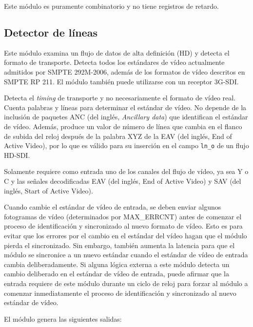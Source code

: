 Este módulo es puramente combinatorio y no tiene registros de retardo.


\subsection{Detector de líneas}

Este módulo examina un flujo de datos de alta definición (HD) y detecta el
formato de transporte. Detecta todos los estándares de vídeo actualmente
admitidos por SMPTE 292M-2006, además de los formatos de vídeo descritos en
SMPTE RP 211. El módulo también puede utilizarse con un receptor 3G-SDI\@.

Detecta el \textit{timing} de transporte y no necesariamente el formato de vídeo real.
Cuenta palabras y líneas para determinar el estándar de vídeo. No depende de la
inclusión de paquetes ANC (del inglés, \textit{Ancillary data}) que identifican el estándar de vídeo. Además, produce
un valor de número de línea que cambia en el flanco de subida del reloj después
de la palabra XYZ de la EAV (del inglés, End of Active Video), por lo que es válido para su inserción en el campo
\texttt{ln\_o} de un flujo HD-SDI\@.

Solamente requiere como entrada uno de los canales del flujo de vídeo, ya sea Y
o C y las señales decodificadas EAV  (del inglés, End of Active Video) y SAV (del inglés, Start of Active Video)\@.

Cuando cambie el estándar de vídeo de entrada, se deben enviar algunos fotogramas
de vídeo (determinados por MAX\_ERRCNT) antes de comenzar el proceso de
identificación y sincronizado al nuevo formato de vídeo. Esto es para evitar que los
errores por el cambio en el estándar del vídeo hagan que el módulo pierda el
sincronizado. Sin embargo, también aumenta la latencia para que el módulo se sincronice a
un nuevo estándar cuando el estándar de vídeo de entrada cambia deliberadamente.
Si alguna lógica externa a este módulo detecta un cambio deliberado
en el estándar de vídeo de entrada, puede afirmar que la entrada requiere de este
módulo durante un ciclo de reloj para forzar al módulo a comenzar inmediatamente
el proceso de identificación y sincronizado al nuevo estándar de vídeo.

El módulo genera las siguientes salidas:

